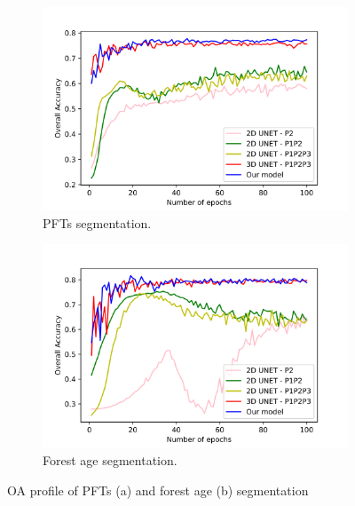 \begin{figure}[p]
    \centering
    \begin{subfigure}{\textwidth}
        \centering
        \includegraphics[width=.9\textwidth]{figs/chap5/spec_acc.png}
        \caption{PFTs segmentation.}
        \label{fig:chap5_fig4}
    \end{subfigure}

    \begin{subfigure}{\textwidth}
        \centering
        \includegraphics[width=.9\textwidth]{figs/chap5/age_acc.png}
        \caption{Forest age segmentation.}
        \label{fig:chap5_fig5}
    \end{subfigure}
    \caption[Study area and annotated data]{OA profile of PFTs (a) and forest age (b) segmentation}
    \label{fig:chap5_fig45}
\end{figure}



